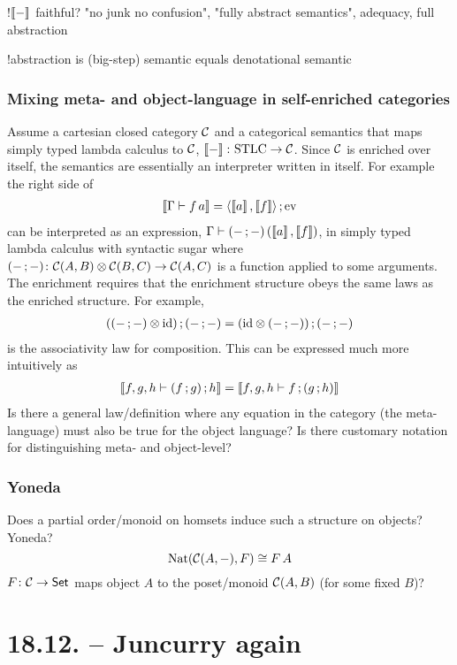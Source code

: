 \documentclass[runningheads,envcountsame]{llncs}
\begin{document}
!$\sem{-}$ faithful? "no junk no confusion", "fully abstract semantics", adequacy, full abstraction

!abstraction is (big-step) semantic equals denotational semantic

\subsubsection{Mixing meta- and object-language in self-enriched categories}
Assume a cartesian closed category $\mathcal{C}$ and a categorical semantics that maps simply typed lambda calculus to $\mathcal{C}$, $\sem{-}\colon \text{STLC} \to \C$. Since $\mathcal{C}$ is enriched over itself, the semantics are essentially an interpreter written in itself. For example the right side of
\begin{gather}
     \sem{\Gamma \vdash \eapp{f}{a}} = \comp{\langle \sem{a}, \sem{f} \rangle}{\eval}
\end{gather}
can be interpreted as an expression, $\Gamma\vdash (\comp{-}{-})\,(\sem{a}, \sem{f})$, in simply typed lambda calculus with syntactic sugar where $(\comp{-}{-})\colon \tensor{\homC{A}{B}}{\homC{B}{C}} \to \homC{A}{C}$ is a function applied to some arguments. The enrichment requires that the enrichment structure obeys the same laws as the enriched structure. For example,
\begin{gather}
    \comp{(\tensor{(\comp{-}{-})}{\id})}{(\comp{-}{-})} = \comp{(\tensor{\id}{(\comp{-}{-})})}{(\comp{-}{-}
)}
\end{gather}
is the associativity law for composition. This can be expressed much more intuitively as
\begin{gather}
    \sem{f, g, h \vdash \comp{(\comp{f}{g})}{h}} = \sem{f, g, h \vdash \comp{f}{(\comp{g}{h})}}
\end{gather}
Is there a general law/definition where any equation in the category (the meta-language) must also be true for the object language? Is there customary notation for distinguishing meta- and object-level?

\subsubsection{Yoneda}
Does a partial order/monoid on homsets induce such a structure on objects? Yoneda?
\[ \mathrm{Nat}(\mathcal{C}(A, -), F) \cong F\,A \]
$F\colon \mathcal{C} \to \mathsf{Set}$ maps object $A$ to the poset/monoid $\mathcal{C}(A, B)$ (for some fixed $B$)?

\section{18.12. -- Juncurry again}
\end{document}
